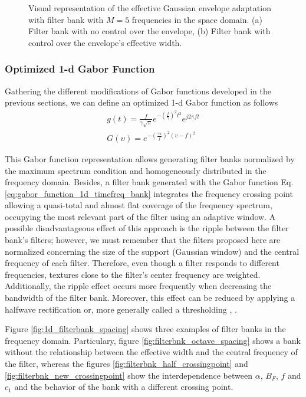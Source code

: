 \documentclass[journal]{IEEEtran}
\begin{document}
\begin{figure}[!ht]
  \caption{Visual representation of the effective Gaussian envelope adaptation with filter bank with $M = 5$ frequencies in the space domain. (a) Filter bank with no control over the envelope, (b) Filter bank with control over the envelope's effective width.}
  \label{fig:1D_space_Gaborfilterbank}
\end{figure}


\subsubsection{Optimized 1-d Gabor Function}
Gathering the different modifications of Gabor functions developed in the previous sections, we can define an optimized 1-d Gabor function as follows
\begin{equation}\label{eq:gabor_function_1d_timefreq_bank}
    \begin{gathered}
         g(t) =  \frac{f}{\gamma \sqrt{\pi}} e ^{-\left(\frac{f}{\gamma}\right)^2 t^2} e ^{j 2 \pi f t } \\
         G(\upsilon) =  e ^{-\left(\frac{\gamma \pi}{f}\right) ^2 (\upsilon-f)^2}
     \end{gathered}
\end{equation}

This Gabor function representation allows generating filter banks normalized by the maximum spectrum condition and homogeneously distributed in the frequency domain. Besides, a filter bank generated with the Gabor function Eq. \eqref{eq:gabor_function_1d_timefreq_bank} integrates the frequency crossing point allowing a quasi-total and almost flat coverage of the frequency spectrum, occupying the most relevant part of the filter using an adaptive window. A possible disadvantageous effect of this approach is the ripple between the filter bank's filters; however, we must remember that the filters proposed here are normalized concerning the size of the support (Gaussian window) and the central frequency of each filter. Therefore, even though a filter responds to different frequencies, textures close to the filter's center frequency are weighted. Additionally, the ripple effect occurs more frequently when decreasing the bandwidth of the filter bank. Moreover, this effect can be reduced by applying a halfwave rectification or, more generally called a thresholding \cite{Petkov:FGCS:1995}, \cite{Grigorescu.Petkov.ea:TIP:2003} \cite{Kruizinga.Petkov:TIP:1999}.

Figure \ref{fig:1d_filterbank_spacing} shows three examples of filter banks in the frequency domain.  Particulary, figure \ref{fig:filterbnk_octave_spacing} shows a bank without the relationship between the effective width and the central frequency of the filter, whereas the figures \ref{fig:filterbnk_half_crossingpoint} and \ref{fig:filterbnk_new_crossingpoint} show the interdependence between $\alpha$, $B_F$, $f$ and $c_1$ and the behavior of the bank with a different crossing point.
\end{document}
